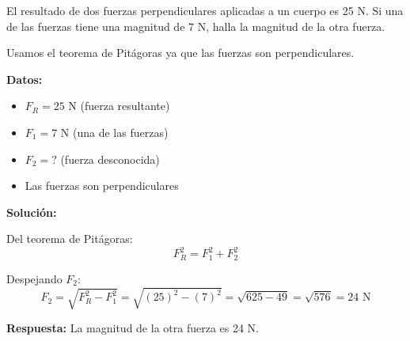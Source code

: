 \begin{exercise}
    El resultado de dos fuerzas perpendiculares aplicadas a un cuerpo es 25 N.
    Si una de las fuerzas tiene una magnitud de 7 N, halla la magnitud de la otra fuerza.


    \begin{solu}
        Usamos el teorema de Pitágoras ya que las fuerzas son perpendiculares.

        \textbf{Datos:}
        \begin{itemize}
            \item $F_R = 25$ N (fuerza resultante)
            \item $F_1 = 7$ N (una de las fuerzas)
            \item $F_2 = ?$ (fuerza desconocida)
            \item Las fuerzas son perpendiculares
        \end{itemize}

        \textbf{Solución:}

        Del teorema de Pitágoras:
        $$F_R^2 = F_1^2 + F_2^2$$

        Despejando $F_2$:
        $$F_2 = \sqrt{F_R^2 - F_1^2} = \sqrt{(25)^2 - (7)^2} = \sqrt{625 - 49} = \sqrt{576} = 24\text{ N}$$

        \textbf{Respuesta:} La magnitud de la otra fuerza es 24 N.
    \end{solu}
\end{exercise}



